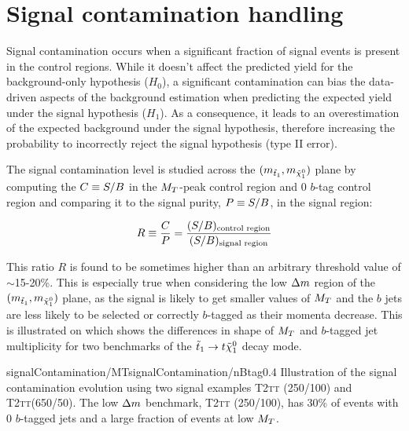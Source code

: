     \section{Signal contamination handling \label{sec:signalContamination}}

    Signal contamination occurs when a significant fraction of signal events is
    present in the control regions. While it doesn't affect the predicted yield
    for the background-only hypothesis ($H_0$), a significant contamination can
    bias the data-driven aspects of the background estimation when predicting
    the expected yield under the signal hypothesis ($H_1$). As a consequence, it
    leads to an overestimation of the expected background under the signal
    hypothesis, therefore increasing the probability to incorrectly reject the
    signal hypothesis (type II error).

    The signal contamination level is studied across the
    $(m_{\tilde{t}_1},m_{\tilde{\chi}_1^0})$ plane by computing the $C \equiv
    S/B$ in the $M_T$-peak control region and 0 $b$-tag control region and
    comparing it to the signal purity, $P \equiv S/B$, in the signal region:

    \begin{equation}
        R \equiv \frac{C}{P} = \frac{(S/B)_\text{control region}}{(S/B)_\text{signal region}}
        \label{eq:contaminationRatio}
    \end{equation}

    This ratio $R$ is found to be sometimes higher than an arbitrary threshold
    value of $\sim$15-20\%.  This is especially true when considering the low
    $\Delta m$ region of the $(m_{\tilde{t}_1}, m_{\tilde{\chi}_1^0})$ plane, as the
    signal is likely to get smaller values of $M_T$ and the $b$ jets are less
    likely to be selected or correctly $b$-tagged as their momenta decrease.
    This is illustrated on  which
    shows the differences in shape of $M_T$ and $b$-tagged jet multiplicity for
    two benchmarks of the $\tilde{t}_1 \rightarrow t \tilde{\chi}_1^0$ decay mode.

                     {signalContamination/MT}{signalContamination/nBtag}{0.4}
                     {Illustration of the signal contamination evolution using
                     two signal examples \textsc{T2tt} (250/100) and
                     \textsc{T2tt}(650/50). The low $\Delta m$ benchmark,
                     \textsc{T2tt} (250/100), has 30\% of events with 0
                     $b$-tagged jets and a large fraction of events at low
                     $M_T$.}

